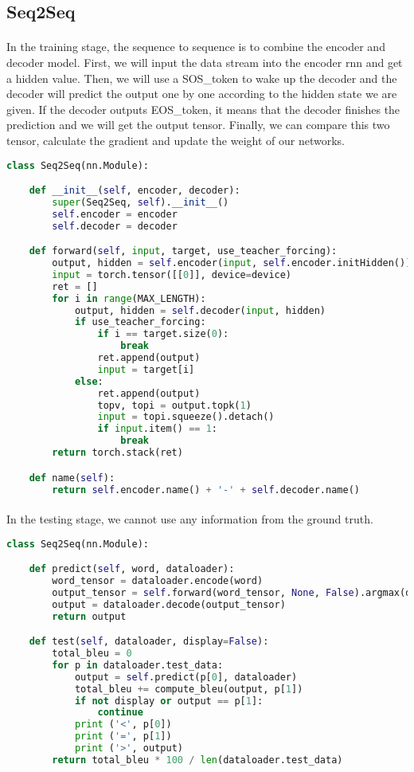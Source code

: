 \subsection{Seq2Seq}
\paragraph{}
In the training stage, the sequence to sequence is to combine the encoder and decoder model. First, we will input the data stream into the encoder rnn and get a hidden value. Then, we will use a SOS\_token to wake up the decoder and the decoder will predict the output one by one according to the hidden state we are given. If the decoder outputs EOS\_token, it means that the decoder finishes the prediction and we will get the output tensor. Finally, we can compare this two tensor, calculate the gradient and update the weight of our networks.
\begin{lstlisting}[language=Python]
class Seq2Seq(nn.Module):

    def __init__(self, encoder, decoder):
        super(Seq2Seq, self).__init__()
        self.encoder = encoder
        self.decoder = decoder

    def forward(self, input, target, use_teacher_forcing):
        output, hidden = self.encoder(input, self.encoder.initHidden())
        input = torch.tensor([[0]], device=device)
        ret = []
        for i in range(MAX_LENGTH):
            output, hidden = self.decoder(input, hidden)
            if use_teacher_forcing:
                if i == target.size(0):
                    break
                ret.append(output)
                input = target[i]
            else:
                ret.append(output)
                topv, topi = output.topk(1)
                input = topi.squeeze().detach()
                if input.item() == 1:
                    break
        return torch.stack(ret)

    def name(self):
        return self.encoder.name() + '-' + self.decoder.name()
\end{lstlisting}
\paragraph{}
In the testing stage, we cannot use any information from the ground truth.
\begin{lstlisting}[language=Python]
class Seq2Seq(nn.Module):

    def predict(self, word, dataloader):
        word_tensor = dataloader.encode(word)
        output_tensor = self.forward(word_tensor, None, False).argmax(dim=2).view(-1, 1)
        output = dataloader.decode(output_tensor)
        return output

    def test(self, dataloader, display=False):
        total_bleu = 0
        for p in dataloader.test_data:
            output = self.predict(p[0], dataloader)
            total_bleu += compute_bleu(output, p[1])
            if not display or output == p[1]:
                continue
            print ('<', p[0])
            print ('=', p[1])
            print ('>', output)
        return total_bleu * 100 / len(dataloader.test_data)
\end{lstlisting}
